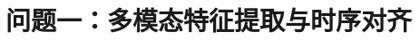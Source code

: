 \documentclass[UTF8,a4paper,zihao=-4,fontset=none]{ctexart}
\begin{document}
\section{问题一：多模态特征提取与时序对齐}

\end{document}
